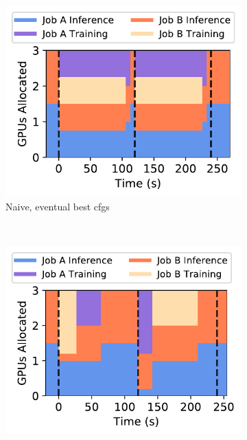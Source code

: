 \begin{figure}[t]
  \centering
  \begin{subfigure}[t]{0.5\columnwidth}
    \centering
    \includegraphics[width=\linewidth]{figures/motivation/Scheduler/schedmot_res_eventual_best_cfgs.pdf}
    \caption{\small Naive, eventual best cfgs}
    \label{fig:schedmot-res-naive}
  \end{subfigure}  
  ~~
  \begin{subfigure}[t]{0.5\columnwidth}
    \centering
    \includegraphics[width=\linewidth]{figures/motivation/Scheduler/schedmot_res_prioritization_and_optimal_cfgs.pdf}

\end{subfigure}
\end{figure}

